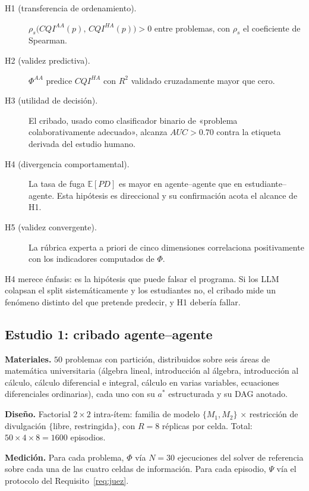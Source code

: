 \documentclass[11pt,a4paper]{article}
\theoremstyle{definition}
\theoremstyle{plain}
\theoremstyle{remark}
\begin{document}
\begin{description}
  \item[H1 (transferencia de ordenamiento).] $\rho_s\big(CQI^{AA}(p),\,CQI^{HA}(p)\big)>0$
        entre problemas, con $\rho_s$ el coeficiente de Spearman.
  \item[H2 (validez predictiva).] $\Phi^{AA}$ predice $CQI^{HA}$ con
        $R^2$ validado cruzadamente mayor que cero.
  \item[H3 (utilidad de decisión).] El cribado, usado como clasificador binario
        de «problema colaborativamente adecuado», alcanza $AUC>0.70$ contra la
        etiqueta derivada del estudio humano.
  \item[H4 (divergencia comportamental).] La tasa de fuga $\mathbb{E}[PD]$ es
        mayor en agente--agente que en estudiante--agente. Esta hipótesis es
        direccional y su confirmación acota el alcance de H1.
  \item[H5 (validez convergente).] La rúbrica experta a priori de cinco
        dimensiones correlaciona positivamente con los indicadores computados de
        $\Phi$.
\end{description}

H4 merece énfasis: es la hipótesis que puede falsar el programa. Si los LLM
colapsan el split sistemáticamente y los estudiantes no, el cribado mide un
fenómeno distinto del que pretende predecir, y H1 debería fallar.

\subsection{Estudio 1: cribado agente--agente}

\textbf{Materiales.} $50$ problemas con partición, distribuidos sobre seis áreas
de matemática universitaria (álgebra lineal, introducción al álgebra, introducción
al cálculo, cálculo diferencial e integral, cálculo en varias variables,
ecuaciones diferenciales ordinarias), cada uno con su $a^\ast$ estructurada y su
DAG anotado.

\textbf{Diseño.} Factorial $2\times2$ intra-ítem: familia de modelo
$\{M_1,M_2\}$ $\times$ restricción de divulgación $\{$libre, restringida$\}$, con
$R=8$ réplicas por celda. Total: $50\times4\times8=1600$ episodios.

\textbf{Medición.} Para cada problema, $\Phi$ vía $N=30$ ejecuciones del solver de
referencia sobre cada una de las cuatro celdas de información. Para cada episodio,
$\Psi$ vía el protocolo del Requisito~\ref{req:juez}.
\end{document}
